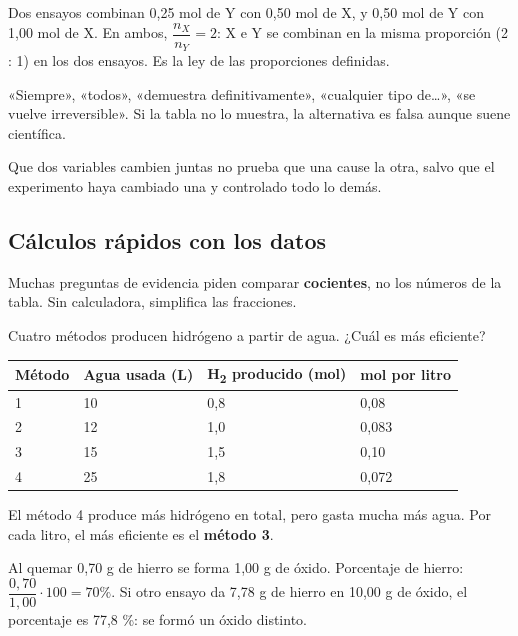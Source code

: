 \begin{ejemplo} Dos ensayos combinan 0,25 mol de Y con 0,50 mol de X, y 0,50 mol de Y con 1,00 mol de X. En ambos, $\dfrac{n_X}{n_Y} = 2$: X e Y se combinan en la misma proporción (2 : 1) en los dos ensayos. Es la ley de las proporciones definidas.\end{ejemplo}
 
\begin{ojo} «Siempre», «todos», «demuestra definitivamente», «cualquier tipo de\dots{}», «se vuelve irreversible». Si la tabla no lo muestra, la alternativa es falsa aunque suene científica.\end{ojo}
 
\begin{ojo} Que dos variables cambien juntas no prueba que una cause la otra, salvo que el experimento haya cambiado una y controlado todo lo demás.\end{ojo}
\subsection{Cálculos rápidos con los datos}
Muchas preguntas de evidencia piden comparar \textbf{cocientes}, no los números de la tabla. Sin calculadora, simplifica las fracciones.

 
\begin{ejemplo} Cuatro métodos producen hidrógeno a partir de agua. ¿Cuál es más eficiente?
\begin{center}\small
\begin{tabular}{@{}llll@{}}
\toprule
\textbf{Método} & \textbf{Agua usada (L)} & \textbf{H\textsubscript{2} producido (mol)} & \textbf{mol por litro} \\
\midrule
1 & 10 & 0,8 & 0,08 \\
2 & 12 & 1,0 & 0,083 \\
3 & 15 & 1,5 & 0,10 \\
4 & 25 & 1,8 & 0,072 \\
\bottomrule
\end{tabular}
\end{center}
 El método 4 produce más hidrógeno en total, pero gasta mucha más agua. Por cada litro, el más eficiente es el \textbf{método 3}.\end{ejemplo}
  
\begin{ejemplo} Al quemar 0,70 g de hierro se forma 1,00 g de óxido. Porcentaje de hierro: $\dfrac{0{,}70}{1{,}00}\cdot 100 = 70\%$. Si otro ensayo da 7,78 g de hierro en 10,00 g de óxido, el porcentaje es 77,8 \%: se formó un óxido distinto.\end{ejemplo}
 
